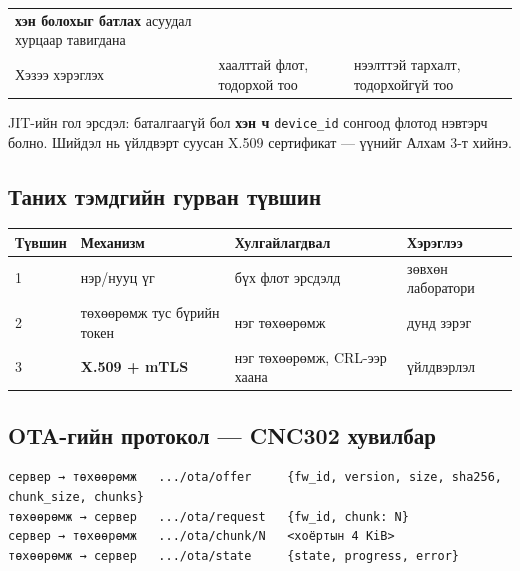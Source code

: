 \begin{longtable}[]{@{}lll@{}}
\begin{minipage}[t]{0.30\columnwidth}
\textbf{хэн болохыг батлах} асуудал хурцаар тавигдана\strut
\end{minipage}\tabularnewline
\begin{minipage}[t]{0.30\columnwidth}\raggedright
Хэзээ хэрэглэх\strut
\end{minipage} & \begin{minipage}[t]{0.30\columnwidth}\raggedright
хаалттай флот, тодорхой тоо\strut
\end{minipage} & \begin{minipage}[t]{0.30\columnwidth}\raggedright
нээлттэй тархалт, тодорхойгүй тоо\strut
\end{minipage}\tabularnewline
\bottomrule
\end{longtable}\endgroup

JIT-ийн гол эрсдэл: баталгаагүй бол \textbf{хэн ч} \texttt{device\_id} сонгоод флотод нэвтэрч болно. Шийдэл нь үйлдвэрт суусан X.509 сертификат --- үүнийг Алхам 3-т хийнэ.

\hypertarget{ux442ux430ux43dux438ux445-ux442ux44dux43cux434ux433ux438ux439ux43d-ux433ux443ux440ux432ux430ux43d-ux442ux4afux432ux448ux438ux43d}{%
\subsection{Таних тэмдгийн гурван түвшин}\label{ux442ux430ux43dux438ux445-ux442ux44dux43cux434ux433ux438ux439ux43d-ux433ux443ux440ux432ux430ux43d-ux442ux4afux432ux448ux438ux43d}}

\begingroup\scriptsize\begin{longtable}[]{@{}llll@{}}
\toprule
Түвшин & Механизм & Хулгайлагдвал & Хэрэглээ\tabularnewline
\midrule
\endhead
1 & нэр/нууц үг & бүх флот эрсдэлд & зөвхөн лаборатори\tabularnewline
2 & төхөөрөмж тус бүрийн токен & нэг төхөөрөмж & дунд зэрэг\tabularnewline
3 & \textbf{X.509 + mTLS} & нэг төхөөрөмж, CRL-ээр хаана & үйлдвэрлэл\tabularnewline
\bottomrule
\end{longtable}\endgroup

\hypertarget{ota-ux433ux438ux439ux43d-ux43fux440ux43eux442ux43eux43aux43eux43b-cnc302-ux445ux443ux432ux438ux43bux431ux430ux440}{%
\subsection{OTA-гийн протокол --- CNC302 хувилбар}\label{ota-ux433ux438ux439ux43d-ux43fux440ux43eux442ux43eux43aux43eux43b-cnc302-ux445ux443ux432ux438ux43bux431ux430ux440}}

\begin{verbatim}
сервер → төхөөрөмж   .../ota/offer     {fw_id, version, size, sha256, chunk_size, chunks}
төхөөрөмж → сервер   .../ota/request   {fw_id, chunk: N}
сервер → төхөөрөмж   .../ota/chunk/N   <хоёртын 4 KiB>
төхөөрөмж → сервер   .../ota/state     {state, progress, error}
\end{verbatim}

